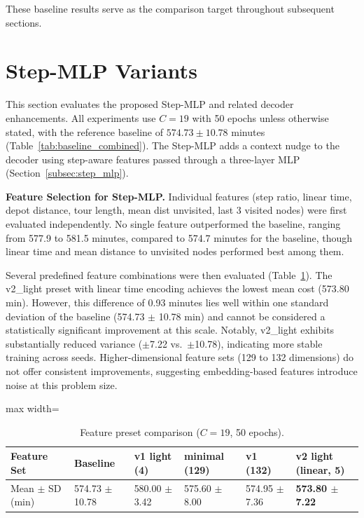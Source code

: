 These baseline results serve as the comparison target throughout subsequent sections.

\section{Step-MLP Variants}
\label{sec:step_mlp_variants}

This section evaluates the proposed Step-MLP and related decoder enhancements. All
experiments use $C = 19$ with 50 epochs unless otherwise stated, with the reference baseline
of $574.73 \pm 10.78$ minutes (Table~\ref{tab:baseline_combined}). The Step-MLP adds a
context nudge to the decoder using step-aware features passed through a three-layer MLP
(Section~\ref{subsec:step_mlp}).

\textbf{Feature Selection for Step-MLP.} Individual features (step ratio, linear time, depot distance, tour length, mean dist
unvisited, last 3 visited nodes) were first evaluated independently. No single feature
outperformed the baseline, ranging from 577.9 to 581.5 minutes, compared to 574.7 minutes
for the baseline, though linear time and mean distance to unvisited nodes performed best
among them.

Several predefined feature combinations were then evaluated (Table~\ref{tab:feature_presets_exp}).
The v2\_light preset with linear time encoding achieves the lowest mean cost (573.80 min).
However, this difference of 0.93 minutes lies well within one standard deviation of the baseline
(574.73 $\pm$ 10.78 min) and cannot be considered a statistically significant improvement at
this scale. Notably, v2\_light exhibits substantially reduced variance ($\pm$7.22 vs.\ $\pm$10.78),
indicating more stable training across seeds. Higher-dimensional feature
sets (129 to 132 dimensions) do not offer consistent improvements, suggesting embedding-based
features introduce noise at this problem size.

\begin{table}[H]
\centering
\caption{Feature preset comparison ($C = 19$, 50 epochs).}
\label{tab:feature_presets_exp}
\begin{adjustbox}{max width=\textwidth}
\begin{tabular}{llllll}
\toprule
\textbf{Feature Set} & \textbf{Baseline} & \textbf{v1 light (4)}
    & \textbf{minimal (129)} & \textbf{v1 (132)} & \textbf{v2 light (linear, 5)} \\
\midrule
Mean $\pm$ SD (min) & 574.73 $\pm$ 10.78 & 580.00 $\pm$ 3.42
    & 575.60 $\pm$ 8.00 & 574.95 $\pm$ 7.36 & \textbf{573.80 $\pm$ 7.22} \\
\bottomrule
\end{tabular}
\end{adjustbox}
\end{table}

